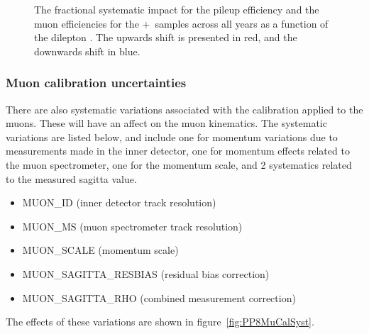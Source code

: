 \begin{figure}[h!]
  \caption{The fractional systematic impact for the pileup efficiency and the muon efficiencies for the \powheg+\pythia~samples across all years as a function of the dilepton \pt. The upwards shift is presented in red, and the downwards shift in blue.}
  \label{fig:PP8SFSyst}
\end{figure}

\subsubsection{Muon calibration uncertainties}
There are also systematic variations associated with the calibration applied to the muons. These will have an affect on the muon kinematics. The systematic variations are listed below, and include
one for momentum variations due to measurements made in the inner detector, one for momentum effects related to the muon spectrometer, one for the momentum scale, and 2 systematics related to the measured sagitta value.
\begin{itemize}
  \item MUON\_ID (inner detector track resolution)
  \item MUON\_MS (muon spectrometer track resolution)
  \item MUON\_SCALE (momentum scale)
  \item MUON\_SAGITTA\_RESBIAS (residual bias correction)
  \item MUON\_SAGITTA\_RHO (combined measurement correction)
\end{itemize}

The effects of these variations are shown in figure~\ref{fig:PP8MuCalSyst}.

